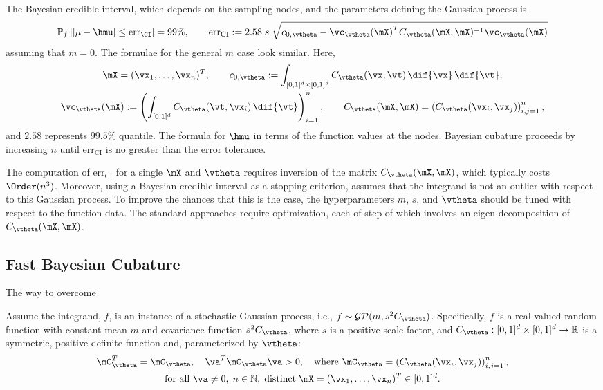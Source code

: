 The Bayesian credible interval, which depends on the sampling nodes, and the parameters defining the Gaussian process is \cite{RatHic19a}
\begin{equation*}
 \mathbb{P}_f \left[
|\mu-\hmu| \leq \text{err}_\CI
\right] = 99\%, \qquad
{\text{err}_{\text{CI}}} := 2.58 \; s \; \sqrt{c_{0,{\vtheta}} - {\vc_{\vtheta}(\mX)}^T C_{\vtheta}(\mX,\mX)^{-1}\vc_{\vtheta}(\mX)}
\end{equation*}
assuming that $m = 0$. The formulae for the general $m$ case look similar. Here,
\begin{gather*}
\label{eqn:fGaussDist_c0}
	\mX = ({\vx}_1, \ldots, {\vx}_n)^T, \qquad c_{0,{\vtheta}} := \int_{[0,1]^{d} \times [0,1]^{d}} C_{\vtheta} (\vx,\vt) \, \dif{\vx} \, \dif{\vt}, \\
 \vc_{\vtheta}(\mX) := \left(  \int_{[0,1]^d} C_{\vtheta} (\vt,\vx_i) \, \dif{\vt} \right)_{i=1}^n, \qquad C_{\vtheta}(\mX,\mX) = \left(  C_{\vtheta}({\vx}_i,{\vx}_j)  \right)_{i,j=1}^n,
	\end{gather*}
and $2.58$ represents $99.5\%$ quantile.  The formula for $\hmu$ in terms of the function values at the nodes.
Bayesian cubature proceeds by increasing $n$ until $\text{err}_{\text{CI}}$ is no greater than the error tolerance.  

The computation of $\text{err}_{\text{CI}}$ for a single $\mX$ and $\vtheta$ requires  inversion of the matrix $ C_{\vtheta}(\mX,\mX)$, which typically costs $\Order(n^3)$.  Moreover, using a Bayesian credible interval as a stopping criterion, assumes that the integrand is not an outlier with respect to this Gaussian process.  To improve the chances that this is the case, the hyperparameters $m$, $s$, and $\vtheta$ should be tuned with respect to the function data.  The standard approaches require optimization, each of step of which involves an eigen-decomposition of $ C_{\vtheta}(\mX,\mX)$.

\subsection*{Fast Bayesian Cubature}
The way to overcome 
\iffalse 









Assume the integrand, $f$, is an instance of a stochastic Gaussian process, i.e., $f \sim \mathcal{GP}(m,s^2 C_{\vtheta})$.  Specifically, $f$ is a real-valued random function with constant mean $m$ and covariance function $s^2C_{\vtheta}$, where $s$ is a positive scale factor, and $C_{\vtheta}: [0,1]^d \times [0,1]^d \to \mathbb{R} $ is a symmetric, positive-definite function and, parameterized by $\vtheta$:
\begin{multline} \label{FJH:eq:CondPosDef}
\mC_{\vtheta}^T = \mC_{\vtheta},  \quad {\va^T} \mC_{\vtheta} {\va} > 0, \quad \text{where }  \mC_{\vtheta} = \left(  C_{\vtheta}({\vx}_i,{\vx}_j)  \right)_{i,j=1}^n, \\
\text{for all } {\va} \ne 0, \;
n\in \mathbb{N}, \; \text{distinct} \; \mX = ({\vx}_1, \ldots, {\vx}_n)^T \in [0,1]^d.
\end{multline}

